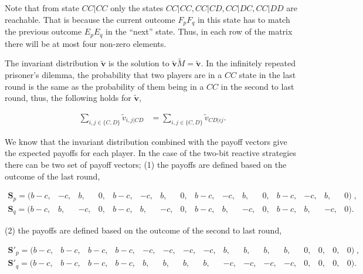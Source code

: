 \documentclass{article}
\theoremstyle{definition}
\begin{document}
Note that from state \(CC|CC\) only the states \(CC|CC, CC|CD, CC|DC, CC|DD\)
are reachable. That is because the current outcome \(F_p F_q\) in this state has
to match the previous outcome \(E_p E_q\) in the ``next'' state. Thus, in each
row of the matrix there will be at most four non-zero elements.

The invariant distribution \(\mathbf{\tilde{v}}\) is the solution to
\(\mathbf{\tilde{v}} \tilde{M} = \mathbf{\tilde{v}}\). In the infinitely
repeated prisoner's dilemma, the probability that two players are in a \(CC\)
state in the last round is the same as the probability of them being in a \(CC\)
in the second to last round, thus, the following holds for
\(\mathbf{\tilde{v}}\),

\begin{align}\label{eq:last_rounds_equality}
  \sum_{i, j \in \{C, D\}} \tilde{v}_{i, j | CD} & = \sum_{i, j \in \{C, D\}} \tilde{v}_{CD | ij}.
\end{align}

We know that the invariant distribution combined with the payoff vectors give
the expected payoffs for each player. In the case of the two-bit reactive
strategies there can be two set of payoff vectors; (1) the payoffs are
defined based on the outcome of the last round,

\begin{equation}\label{eq:last_round_two_bits}
  \begin{array}{*{16}{c}}
    \mathbf{S}_{p} = ( b - c , & -c , & b , & 0 , & b - c , & -c , & b , & 0 , & b - c , & -c , & b , & 0 , & b - c , & -c , & b , & 0)  \;, \\
    \mathbf{S}_{q} = ( b - c, & b, & -c, & 0, & b - c, & b, & -c, & 0, & b - c, & b, & -c, & 0, & b - c, & b, & -c, & 0).
  \end{array}
\end{equation}

(2) the payoffs are defined based on the outcome of the second to last round,

\begin{equation}\label{eq:second_to_last_round_two_bits}
  \begin{array}{*{16}{c}}
    \mathbf{S}'_{p} = (b - c, & b - c, & b - c, & b - c, & -c, & -c, & -c, & -c, & b, & b, & b, & b, & 0, & 0, & 0, & 0)  \;, \\
    \mathbf{S}'_{q} = (b - c, & b - c, & b - c, & b - c, & b, & b, & b, & b, & -c, & -c, & -c, & -c, & 0, & 0, & 0, & 0).
  \end{array}
\end{equation}
\end{document}
